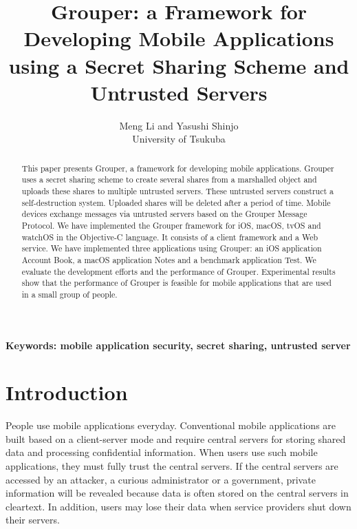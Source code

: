 \documentclass[twocolumn,10pt]{article}
\begin{document}
\title{\bf Grouper: a Framework for Developing Mobile Applications using a Secret Sharing Scheme and Untrusted Servers}

\author{
	Meng Li and Yasushi Shinjo \\
	University of Tsukuba
}

\maketitle

\begin{abstract}

This paper presents Grouper, a framework for developing mobile applications.
Grouper uses a secret sharing scheme to create several shares from a marshalled object and uploads these shares to multiple untrusted servers. 
These untrusted servers construct a self-destruction system.
Uploaded shares will be deleted after a period of time.
Mobile devices exchange messages via untrusted servers based on the Grouper Message Protocol.
We have implemented the Grouper framework for iOS, macOS, tvOS and watchOS in the Objective-C language.
It consists of a client framework and a Web service.
We have implemented three applications using Grouper: an iOS application Account Book, a macOS application Notes and a benchmark application Test.
We evaluate the development efforts and the performance of Grouper. 
Experimental results show that the performance of Grouper is feasible for mobile applications that are used in a small group of people.

\end{abstract}

\textbf{Keywords: mobile application security, secret sharing, untrusted server}

\section{Introduction}

People use mobile applications everyday. 
Conventional mobile applications are built based on a client-server mode and require central servers for storing shared data and processing confidential information.
When users use such mobile applications, they must fully trust the central servers.
If the central servers are accessed by an attacker, a curious administrator or a government, private information will be revealed because data is often stored on the central servers in cleartext. 
In addition, users may lose their data when service providers shut down their servers.
\end{document}
